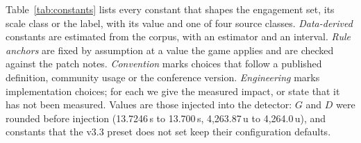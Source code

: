 Table~\ref{tab:constants} lists every constant that shapes the engagement set, its scale class or the
label, with its value and one of four source classes. \emph{Data-derived} constants are estimated from the corpus, with an estimator and
an interval. \emph{Rule anchors} are fixed by assumption at a value the game applies and are checked
against the patch notes. \emph{Convention} marks choices that follow a published definition, community
usage or the conference version. \emph{Engineering} marks implementation choices; for each we give the
measured impact, or state that it has not been measured. Values are those injected into the detector: $G$ and $D$ were rounded before injection
(13.7246\,s to 13.700\,s, 4,263.87\,u to 4,264.0\,u), and constants that the v3.3 preset does not set
keep their configuration defaults.

